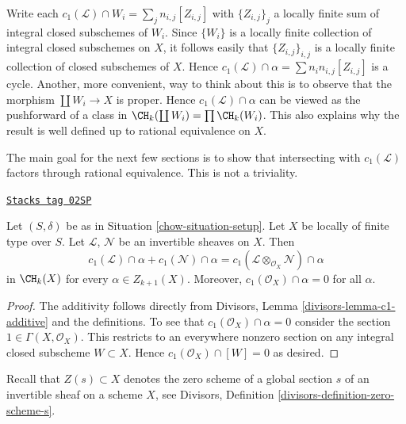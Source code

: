 Write each $c_1(\mathcal{L}) \cap W_i = \sum_j n_{i, j} [Z_{i, j}]$
with $\{Z_{i, j}\}_j$ a locally finite sum
of integral closed subschemes of $W_i$. Since $\{W_i\}$ is a locally
finite collection of integral closed subschemes on $X$, it follows
easily that $\{Z_{i, j}\}_{i, j}$ is a locally finite collection
of closed subschemes of $X$. Hence
$c_1(\mathcal{L}) \cap \alpha = \sum n_in_{i, j}[Z_{i, j}]$
is a cycle. Another, more convenient, way to think about this
is to observe that the morphism $\coprod W_i \to X$ is
proper. Hence $c_1(\mathcal{L}) \cap \alpha$ can be viewed
as the pushforward of a class in $\CH_k(\coprod W_i) = \prod \CH_k(W_i)$.
This also explains why the result is well defined up to rational
equivalence on $X$.

\medskip\noindent
The main goal for the next few sections is to show that intersecting with
$c_1(\mathcal{L})$ factors through rational equivalence.
This is not a triviality.

\begin{lemma}
\label{chow-lemma-c1-cap-additive}
\href{https://stacks.math.columbia.edu/tag/02SP}{\texttt{Stacks tag 02SP}}

Let $(S, \delta)$ be as in Situation \ref{chow-situation-setup}.
Let $X$ be locally of finite type over $S$.
Let $\mathcal{L}$, $\mathcal{N}$ be an invertible sheaves on $X$.
Then
$$
c_1(\mathcal{L}) \cap \alpha  + c_1(\mathcal{N}) \cap \alpha =
c_1(\mathcal{L} \otimes_{\mathcal{O}_X} \mathcal{N}) \cap \alpha
$$
in $\CH_k(X)$ for every $\alpha \in Z_{k + 1}(X)$. Moreover,
$c_1(\mathcal{O}_X) \cap \alpha = 0$ for all $\alpha$.
\end{lemma}

\begin{proof}
The additivity follows directly from
Divisors, Lemma \ref{divisors-lemma-c1-additive}
and the definitions. To see that $c_1(\mathcal{O}_X) \cap \alpha = 0$
consider the section $1 \in \Gamma(X, \mathcal{O}_X)$. This restricts
to an everywhere nonzero section on any integral closed subscheme
$W \subset X$. Hence $c_1(\mathcal{O}_X) \cap [W] = 0$ as desired.
\end{proof}

Recall that $Z(s) \subset X$ denotes the zero scheme of a global section
$s$ of an invertible sheaf on a scheme $X$, see
Divisors, Definition \ref{divisors-definition-zero-scheme-s}.

